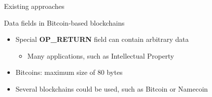 %
%	
%

\begin{frame}{Existing approaches}
	\begin{exampleblock}{Data fields in Bitcoin-based blockchains}
		\begin{itemize}
			\item Special \textbf{OP\_RETURN} field can contain arbitrary data
			\begin{itemize}
				\item Many applications, such as Intellectual Property
			\end{itemize}
			\item Bitcoins: maximum size of 80 bytes
			\item Several blockchains could be used, such as Bitcoin or Namecoin
		\end{itemize}
	\end{exampleblock}
\end{frame}







